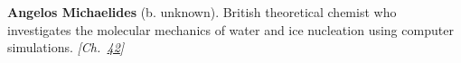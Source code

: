 \textbf{Angelos Michaelides} (b. unknown). British theoretical chemist who investigates the molecular mechanics of water and ice nucleation using computer simulations. \emph{[Ch.~\hyperref[ch:iceslipperiness]{42}]}

